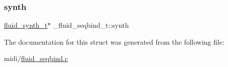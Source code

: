 \subsubsection{\texorpdfstring{synth}{synth}}
{\footnotesize\ttfamily \hyperlink{types_8h_ae265f10ae174a13afe010de50d87e1a4}{fluid\+\_\+synth\+\_\+t}$\ast$ \+\_\+fluid\+\_\+seqbind\+\_\+t\+::synth}



The documentation for this struct was generated from the following file\+:\begin{DoxyCompactItemize}
\item 
midi/\hyperlink{fluid__seqbind_8c}{fluid\+\_\+seqbind.\+c}\end{DoxyCompactItemize}
